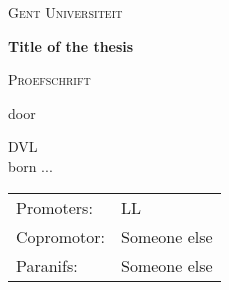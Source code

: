 

\begin{titlepage}


\fontsize{12pt}{14pt}
\selectfont

\begin{center}


\textsc{Gent Universiteit}

\vspace*{\fill}

{\huge \bf Title of the thesis}

\vspace*{\fill}

\textsc{Proefschrift}

\vspace*{\fill}

door

\vspace*{\fill}

DVL\\

born ...

\end{center}

\clearpage

\begin{tabular}{ll}
 Promoters: & LL \\
 Copromotor: & Someone else \\
 Paranifs: & Someone else
\end{tabular}


\end{titlepage}

\thispagestyle{empty}